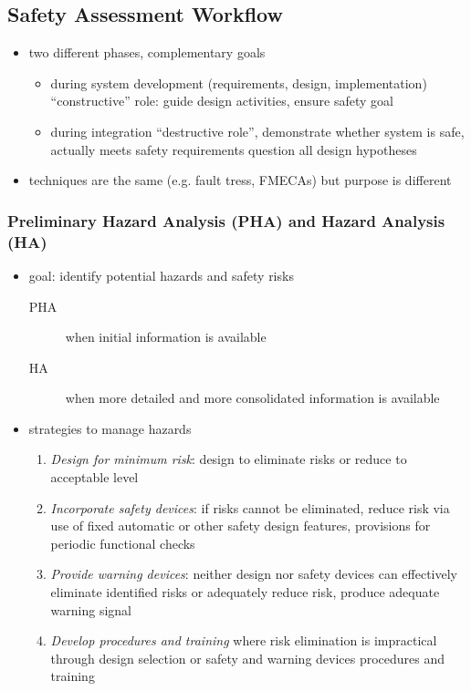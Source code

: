 \documentclass[a4paper, 10pt]{article}
\begin{document}
\subsection*{Safety Assessment Workflow}
\begin{itemize}
    \item two different phases, complementary goals
    \begin{itemize}
        \item during system development (requirements, design, implementation) \follows ``constructive'' role: guide design activities, ensure safety goal
        \item during integration \follows ``destructive role'', demonstrate whether system is safe, actually meets safety requirements \follows question all design hypotheses
    \end{itemize}
    \item techniques are the same (e.g. fault tress, FMECAs) but purpose is different
\end{itemize}

\subsubsection*{Preliminary Hazard Analysis (PHA) and Hazard Analysis (HA)}
\begin{itemize}
    \item goal: identify potential hazards and safety risks
    \begin{description}
        \item[PHA] when initial information is available
        \item[HA] when more detailed and more consolidated information is available
    \end{description}
    \item strategies to manage hazards
    \begin{enumerate}
        \item \emph{Design for minimum risk}: design to eliminate risks or reduce to acceptable level
        \item \emph{Incorporate safety devices}: if risks cannot be eliminated, reduce risk via use of fixed automatic or other safety design features, provisions for periodic functional checks
        \item \emph{Provide warning devices}: neither design nor safety devices can effectively eliminate identified risks or adequately reduce risk, produce adequate warning signal
        \item \emph{Develop procedures and training} where risk elimination is impractical through design selection or safety and warning devices \follows procedures and training
    \end{enumerate}
\end{itemize}
\end{document}
